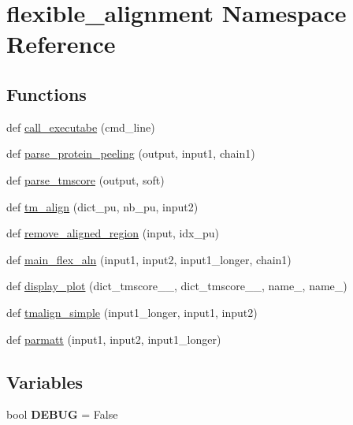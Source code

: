 \hypertarget{namespaceflexible__alignment}{}\section{flexible\+\_\+alignment Namespace Reference}
\label{namespaceflexible__alignment}
\subsection*{Functions}
\begin{DoxyCompactItemize}
\item 
def \hyperlink{namespaceflexible__alignment_a12ec477a3dff498a3a02a7ff3aa538fa}{call\+\_\+executabe} (cmd\+\_\+line)
\item 
def \hyperlink{namespaceflexible__alignment_a0f14ab2865be6c5a6cc5a3f688b0d137}{parse\+\_\+protein\+\_\+peeling} (output, input1, chain1)
\item 
def \hyperlink{namespaceflexible__alignment_a35eb5e0fce983b349c6011a86a655eda}{parse\+\_\+tmscore} (output, soft)
\item 
def \hyperlink{namespaceflexible__alignment_aaab82e271218bc1d63b3f8edae1977cc}{tm\+\_\+align} (dict\+\_\+pu, nb\+\_\+pu, input2)
\item 
def \hyperlink{namespaceflexible__alignment_a5c513cf8a870212e6bbe35abf93d8f28}{remove\+\_\+aligned\+\_\+region} (input, idx\+\_\+pu)
\item 
def \hyperlink{namespaceflexible__alignment_a8f26535b144e909c60f6ac3cfc0b3a15}{main\+\_\+flex\+\_\+aln} (input1, input2, input1\+\_\+longer, chain1)
\item 
def \hyperlink{namespaceflexible__alignment_a4cd4b0ab22694508394f1d173cf2adf3}{display\+\_\+plot} (dict\+\_\+tmscore\+\_\+\_, dict\+\_\+tmscore\+\_\+\_, name\+\_, name\+\_)
\item 
def \hyperlink{namespaceflexible__alignment_ab55bda24cab9e03ff78dda73b13afbf9}{tmalign\+\_\+simple} (input1\+\_\+longer, input1, input2)
\item 
def \hyperlink{namespaceflexible__alignment_a5a10eda9f2b9c977b68953c2658424e3}{parmatt} (input1, input2, input1\+\_\+longer)
\end{DoxyCompactItemize}
\subsection*{Variables}
\begin{DoxyCompactItemize}
\item 
\mbox{\label{namespaceflexible__alignment_ab8be91ed707d27190e91704fa4d0e43c}} 
bool {\bfseries D\+E\+B\+UG} = False
\end{DoxyCompactItemize}


